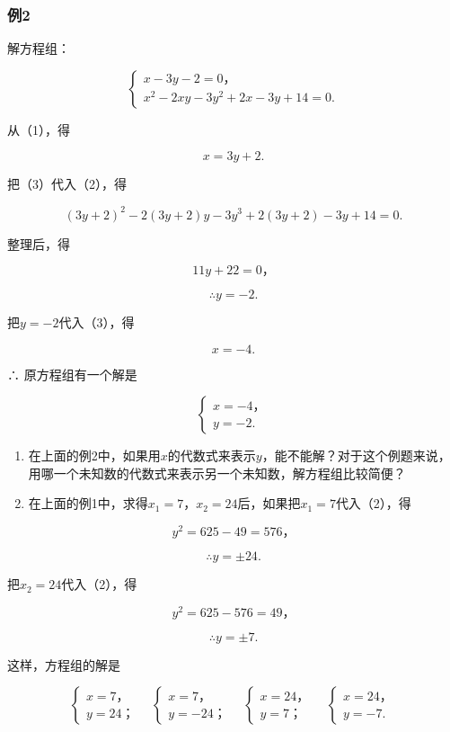 \subsubsection{例2}

解方程组：

\[
\left\{ \begin{array}{l} x - 3 y - 2 = 0\text{，} \\ x ^ {2} - 2 x y - 3 y ^ {2} + 2 x - 3 y + 14 = 0. \end{array} \right. \tag{1}
\]

 从（1），得

\[
x = 3 y + 2. \tag{3}
\]

把（3）代入（2），得

\[
(3 y + 2) ^ {2} - 2 (3 y + 2) y - 3 y ^ {3} + 2 (3 y + 2) - 3 y + 14 = 0.
\]

整理后，得

\[
11 y + 22 = 0\text{，}
\]

\[
\therefore y = - 2.
\]

把\(y = -2\)代入（3），得

\[
x = - 4.
\]

∴ 原方程组有一个解是

\[
\left\{ \begin{array}{l} x = - 4\text{，} \\ y = - 2. \end{array} \right.
\]

\begin{enumerate}
\item
  在上面的例2中，如果用\(x\)的代数式来表示\(y\)，能不能解？对于这个例题来说，用哪一个未知数的代数式来表示另一个未知数，解方程组比较简便？
\item
  在上面的例1中，求得\(x_{1} = 7\)，\(x_{2} = 24\)后，如果把\(x_{1} = 7\)代入（2），得
\end{enumerate}

\[
y ^ {2} = 625 - 49 = 576\text{，}
\]

\[
\therefore y = \pm 24.
\]

把\(x_{2} = 24\)代入（2），得

\[
y ^ {2} = 625 - 576 = 49\text{，}
\]

\[
\therefore y = \pm 7.
\]

这样，方程组的解是

\[
\left\{ \begin{array}{ll} x = 7\text{，} \\ y = 24\text{；} \end{array} \right. \quad \left\{ \begin{array}{ll} x = 7\text{，} \\ y = - 24\text{；} \end{array} \right. \quad \left\{ \begin{array}{ll} x = 24\text{，} \\ y = 7\text{；} \end{array} \right. \quad \left\{ \begin{array}{ll} x = 24\text{，} \\ y = - 7. \end{array} \right.
\]

